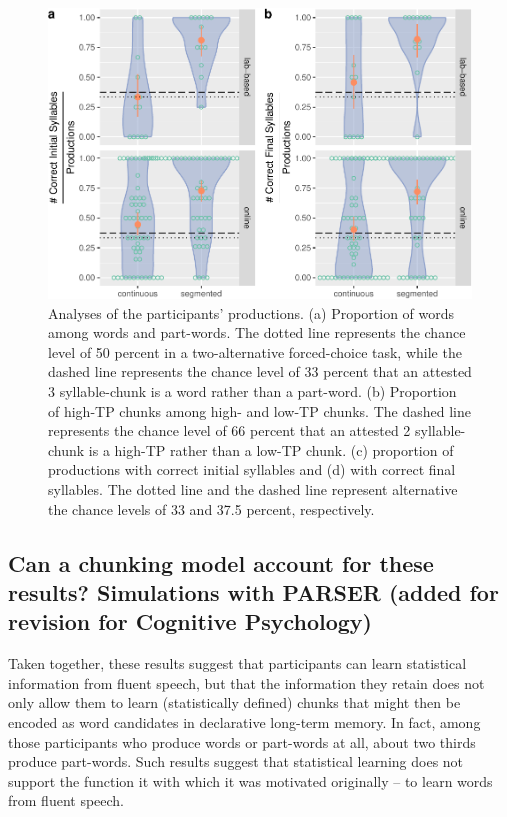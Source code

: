 \documentclass[
]{article}
\begin{document}
\begin{figure}

{\centering \includegraphics[width=0.8\linewidth]{segmentation_recall_combined_for_revision4_files/figure-latex/recall-w-pw-chunks-positions-plot-positions-1} 

}

\caption{Analyses of the participants' productions. (a) Proportion of words among words and part-words. The dotted line represents the chance level of 50 percent in a two-alternative forced-choice task, while the dashed line represents the chance level of 33 percent that an attested 3 syllable-chunk is a word rather than a part-word. (b) Proportion of high-TP chunks among high- and low-TP chunks. The dashed line represents the chance level of 66 percent that an attested 2 syllable-chunk is a high-TP rather than a low-TP chunk. (c) proportion of productions with correct initial syllables and (d) with correct final syllables. The dotted line and the dashed line represent alternative the chance levels of 33 and 37.5 percent, respectively.}\label{fig:recall-w-pw-chunks-positions-plot-positions}
\end{figure}

\clearpage

\subsection{Can a chunking model account for these results? Simulations
with PARSER (added for revision for Cognitive
Psychology)}\label{can-a-chunking-model-account-for-these-results-simulations-with-parser-added-for-revision-for-cognitive-psychology}

Taken together, these results suggest that participants can learn
statistical information from fluent speech, but that the information
they retain does not only allow them to learn (statistically defined)
chunks that might then be encoded as word candidates in declarative
long-term memory. In fact, among those participants who produce words or
part-words at all, about two thirds produce part-words. Such results
suggest that statistical learning does not support the function it with
which it was motivated originally -- to learn words from fluent speech.
\end{document}

